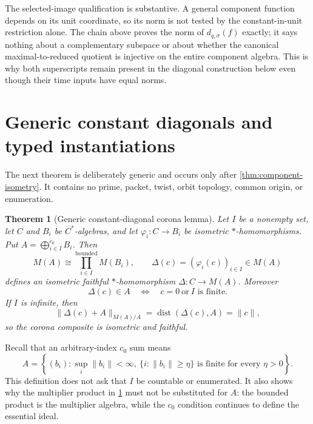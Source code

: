 \documentclass[11pt]{article}
\newtheorem{theorem}{Theorem}[section]
\theoremstyle{definition}
\newcommand{\dist}{\operatorname{dist}}
\begin{document}
The selected-image qualification is substantive.  A general component
function depends on its unit coordinate, so its norm is not tested by the
constant-in-unit restriction alone.  The chain above proves the norm of
$d_{q,\sigma}(f)$ exactly; it says nothing about a complementary subspace or
about whether the canonical maximal-to-reduced quotient is injective on the
entire component algebra.  This is why both superscripts remain present in
the diagonal construction below even though their time inputs have equal
norms.

\section{Generic constant diagonals and typed instantiations}\label{sec:generic}

The next theorem is deliberately generic and occurs only after
\cref{thm:component-isometry}.  It contains no prime, packet, twist, orbit
topology, common origin, or enumeration.

\begin{theorem}[Generic constant-diagonal corona lemma]\label{thm:generic-diagonal}
Let $I$ be a nonempty set, let $C$ and $B_i$ be $C^*$-algebras, and let
$\varphi_i:C\to B_i$ be isometric $*$-homomorphisms.  Put
$A=\bigoplus_{i\in I}^{c_0}B_i$.  Then
\[
 M(A)\cong\prod_{i\in I}^{\mathrm{bounded}}M(B_i),
 \qquad
 \Delta(c)=(\varphi_i(c))_{i\in I}\in M(A)
\]
defines an isometric faithful $*$-homomorphism $\Delta:C\to M(A)$.  Moreover
\[
 \Delta(c)\in A\quad\Longleftrightarrow\quad c=0\ \text{or}\ I\text{ is finite}.
\]
If $I$ is infinite, then
\[
 \lVert\Delta(c)+A\rVert_{M(A)/A}
   =\dist(\Delta(c),A)=\lVert c\rVert,
\]
so the corona composite is isometric and faithful.
\end{theorem}

Recall that an arbitrary-index $c_0$ sum means
\[
 A=\left\{(b_i):\sup_i\lVert b_i\rVert<\infty,
 \ \{i:\lVert b_i\rVert\geq\eta\}\text{ is finite for every }\eta>0
 \right\}.
\]
This definition does not ask that $I$ be countable or enumerated.  It also
shows why the multiplier product in \cref{thm:generic-diagonal} must not be
substituted for $A$: the bounded product is the multiplier algebra, while
the $c_0$ condition continues to define the essential ideal.
\end{document}
